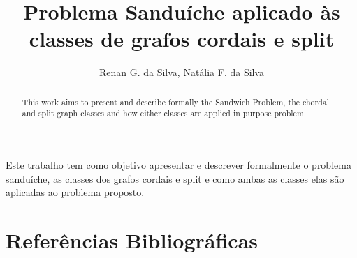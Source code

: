 \documentclass[12pt]{article}
\title{Problema Sanduíche aplicado às classes de grafos cordais e split}
\author{Renan G. da Silva\inst{1}, Natália F. da Silva\inst{1}}
\begin{document}
 

\maketitle
     
\begin{resumo} 
  Este trabalho tem como objetivo apresentar e descrever formalmente o problema sanduíche, as classes dos grafos cordais e split e como ambas as classes elas são aplicadas ao problema proposto.
\end{resumo}

\begin{abstract}
This work aims to present and describe formally the Sandwich Problem, the chordal and split graph classes and how either classes are applied in purpose problem.
\end{abstract}







%



\section{Referências Bibliográficas}



\end{document}

